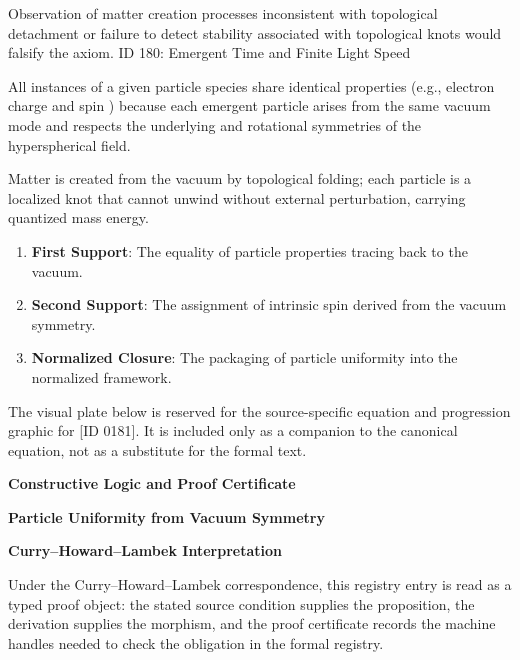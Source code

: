 Observation of matter creation processes inconsistent with topological detachment or failure to detect stability associated with topological knots would falsify the axiom. ID 180: Emergent Time and Finite Light Speed

All instances of a given particle species share identical properties (e.g., electron charge and spin ) because each emergent particle arises from the same vacuum mode and respects the underlying and rotational symmetries of the hyperspherical field.  

Matter is created from the vacuum by topological folding; each particle is a localized knot that cannot unwind without external perturbation, carrying quantized mass energy.
\endgroup

\begin{enumerate}[leftmargin=1.6em,itemsep=6pt,topsep=4pt]
\item \textbf{First Support}: The equality of particle properties tracing back to the vacuum.
\item \textbf{Second Support}: The assignment of intrinsic spin derived from the vacuum symmetry.
\item \textbf{Normalized Closure}: The packaging of particle uniformity into the normalized framework.
\end{enumerate}

\begingroup\footnotesize\sloppy
The visual plate below is reserved for the source-specific equation and progression graphic for [ID 0181]. It is included only as a companion to the canonical equation, not as a substitute for the formal text.
\par\endgroup
\ifTZPDarkEdition
{}
\fi

\clearpage
\begingroup\tzpsupportsetup
\noindent\textbf{\fontsize{10.8pt}{12.8pt}\selectfont [ID 0181] Constructive Logic and Proof Certificate}\par
\noindent\textbf{\fontsize{10pt}{12pt}\selectfont Particle Uniformity from Vacuum Symmetry}\par
\vspace{0.45em}
\begingroup
\footnotesize
\setlength{\parskip}{0.22em}
\setlength{\parindent}{0pt}
\noindent\textbf{Curry--Howard--Lambek Interpretation}\par
Under the Curry--Howard--Lambek correspondence, this registry entry is read as a typed proof
object: the stated source condition supplies the proposition, the derivation supplies the
morphism, and the proof certificate records the machine handles needed to check the obligation
in the formal registry.

